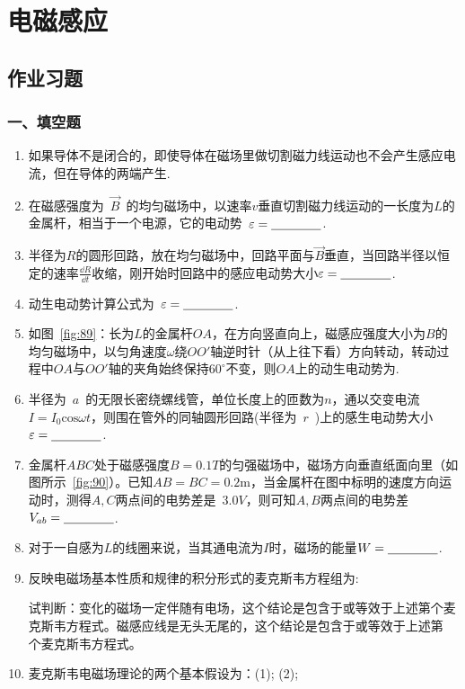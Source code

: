 \chapter{电磁感应}
\section{作业习题}
\subsection*{一、填空题}
\begin{enumerate}
    \item 如果导体不是闭合的，即使导体在磁场里做切割磁力线运动也不会产生感应电流，但在导体的两端产生\nl.
    \item 在磁感强度为~$\vec{B}$~的均匀磁场中，以速率$v$垂直切割磁力线运动的一长度为$L$的金属杆，相当于一个电源，它的电动势~$\varepsilon=\nl$.
    \item 半径为$R$的圆形回路，放在均匀磁场中，回路平面与$\vec{B}$垂直，当回路半径以恒定的速率$\frac{\dd R}{\dd t}$收缩，刚开始时回路中的感应电动势大小$\varepsilon=\nl$.
    \item 动生电动势计算公式为~$\varepsilon=\nl$.
    \item 如图~\ref{fig:89}：长为$L$的金属杆$OA$，在方向竖直向上，磁感应强度大小为$B$的均匀磁场中，以匀角速度$\omega$绕$OO'$轴逆时针（从上往下看）方向转动，转动过程中$OA$与$OO'$轴的夹角始终保持$60^\circ$不变，则$OA$上的动生电动势为\nl.
    \item 半径为~$a$~的无限长密绕螺线管，单位长度上的匝数为$n$，通以交变电流$I=I_0\mathrm{cos}\omega t$，则围在管外的同轴圆形回路(半径为~$r$~)上的感生电动势大小$\varepsilon=\nl$.
    \item 金属杆$ABC$处于磁感强度$B=0.1 T$的匀强磁场中，磁场方向垂直纸面向里（如图所示~\ref{fig:90}）。已知$AB=BC=0.2 \mathrm{m}$，当金属杆在图中标明的速度方向运动时，测得$A,C$两点间的电势差是~$3.0V$，则可知$A,B$两点间的电势差$V_{ab}=\nl$.
    \item 对于一自感为$L$的线圈来说，当其通电流为$I$时，磁场的能量$W=\nl$.
    \item 反映电磁场基本性质和规律的积分形式的麦克斯韦方程组为:
    \par
    试判断：变化的磁场一定伴随有电场，这个结论是包含于或等效于上述第\nl 个麦克斯韦方程式。磁感应线是无头无尾的，这个结论是包含于或等效于上述第\\
    \nl 个麦克斯韦方程式。
    \item 麦克斯韦电磁场理论的两个基本假设为：(1)\underline{\makebox[2.5cm]{}};  (2)\underline{\makebox[2.5cm]{}};
\end{enumerate}
